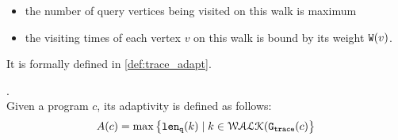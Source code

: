 \begin{itemize}
\item the number of query vertices being visited on this walk is maximum
\item the visiting times of each vertex $v$ on this walk is bound by its weight $\mathtt{W}(v)$.
\end{itemize}
%
It is formally defined in \ref{def:trace_adapt}.
%
\begin{defn}
    .
    \label{def:trace_adapt}
    \\
    Given a program ${c}$, 
    its adaptivity is defined as follows:
    $$
    A(c) = \max \big 
    \{ \mathtt{len}_{\tt q}(k) \mid k \in \mathcal{WALK}(\mathtt{{G_{trace}}}(c) \big \} 
    $$
    \end{defn}
%
%
%
%
%
%
%
%
% 
%
\clearpage
